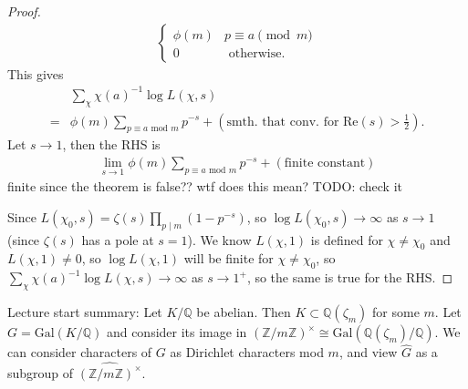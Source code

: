 \documentclass{article}
\theoremstyle{definition}
\begin{document}
\begin{proof}
\begin{align*}
\begin{cases}
            \phi(m) & p \equiv a \pmod{m}\\
            0 & \text{ otherwise}.
        \end{cases}
    \end{align*}
    This gives 
    \begin{align*}
        &\sum_{\chi}^{} \chi(a)^{-1} \log L(\chi,s) \\
        =& \phi(m) \sum_{p \equiv a \text{ mod }m}^{} p^{-s} + \left(\text{smth. that conv. for }\text{Re}(s)>\frac{1}{2}\right).
    \end{align*}
    Let $s \to 1$, then the RHS is 
    \begin{align*}
        \lim_{s \to 1} \phi(m) \sum_{p \equiv a \text{ mod }m}^{} p^{-s} + \left(\text{finite constant}\right)
    \end{align*}
    finite since the theorem is false?? wtf does this mean? TODO: check it
    \vspace{1mm}
     
    Since $L(\chi_0,s) = \zeta(s) \prod_{p \mid m}^{} (1-p^{-s})$, so $\log L(\chi_0,s) \to \infty$ as $s \to 1$ (since $\zeta(s)$ has a pole at $s=1$). We know $L(\chi,1)$ is defined for $\chi \neq \chi_0$ and $L(\chi,1) \neq 0$, so $\log L(\chi,1)$ will be finite for $\chi \neq \chi_0$, so $\sum_{\chi}^{} \chi(a)^{-1} \log L(\chi,s) \to \infty$ as $s \to 1^+$, so the same is true for the RHS. 
\end{proof}

Lecture start summary: Let $K/\mathbb{Q}$ be abelian. Then $K \subset \mathbb{Q}(\zeta_m)$ for some $m$. Let $G = \text{Gal}(K/\mathbb{Q})$ and consider its image in $(\mathbb{Z}/m\mathbb{Z})^\times \cong \text{Gal}(\mathbb{Q}(\zeta_m)/\mathbb{Q})$. We can consider characters of $G$ as Dirichlet characters mod $m$, and view $\widehat{G}$ as a subgroup of $\widehat{(\mathbb{Z}/m\mathbb{Z})^\times}$.
\end{document}
